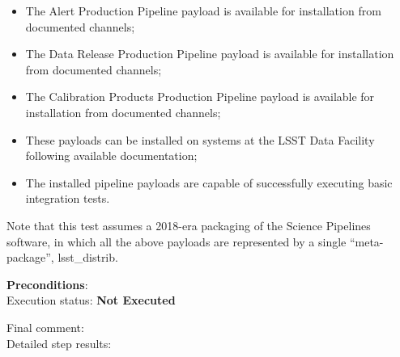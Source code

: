 \documentclass[DM,lsstdraft,STR,toc]{lsstdoc}
\providecommand{\tightlist}{
  \setlength{\itemsep}{0pt}\setlength{\parskip}{0pt}}
\begin{document}
\begin{itemize}
\tightlist
\item
  The Alert Production Pipeline payload is available for installation
  from documented channels;
\item
  The Data Release Production Pipeline payload is available for
  installation from documented channels;
\item
  The Calibration Products Production Pipeline payload is available for
  installation from documented channels;
\item
  These payloads can be installed on systems at the LSST Data Facility
  following available documentation;
\item
  The installed pipeline payloads are capable of successfully executing
  basic integration tests.
\end{itemize}

Note that this test assumes a 2018-era packaging of the Science
Pipelines software, in which all the above payloads are represented by a
single ``meta-package'', lsst\_distrib.


    {\bf Preconditions}:\\
    

    Execution status: {\bf Not Executed }

    Final comment:\\


    Detailed step results:
\end{document}
